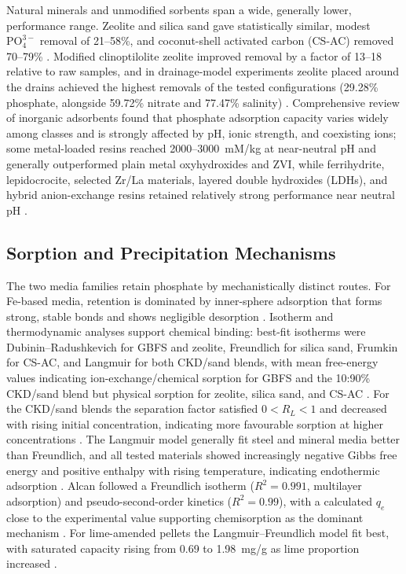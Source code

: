 \documentclass[11pt]{article}
\begin{document}
Natural minerals and unmodified sorbents span a wide, generally lower,
performance range. Zeolite and silica sand gave statistically similar, modest
$\mathrm{PO_4^{3-}}$ removal of 21--58\%, and coconut-shell activated carbon
(CS-AC) removed 70--79\% \parencite{Agrawal2011}. Modified clinoptilolite zeolite
improved removal by a factor of 13--18 relative to raw samples, and in
drainage-model experiments zeolite placed around the drains achieved the highest
removals of the tested configurations (29.28\% phosphate, alongside 59.72\%
nitrate and 77.47\% salinity) \parencite{Sadeghi2021}. Comprehensive review of
inorganic adsorbents found that phosphate adsorption capacity varies widely among
classes and is strongly affected by pH, ionic strength, and coexisting ions; some
metal-loaded resins reached 2000--3000~mM/kg at near-neutral pH and generally
outperformed plain metal oxyhydroxides and ZVI, while ferrihydrite,
lepidocrocite, selected Zr/La materials, layered double hydroxides (LDHs), and
hybrid anion-exchange resins retained relatively strong performance near neutral
pH \parencite{Li2020}.

\subsection{Sorption and Precipitation Mechanisms}

The two media families retain phosphate by mechanistically distinct routes.
For Fe-based media, retention is dominated by inner-sphere adsorption that forms
strong, stable bonds and shows negligible desorption \parencite{Mendes2022}.
Isotherm and thermodynamic analyses support chemical binding: best-fit isotherms
were Dubinin--Radushkevich for GBFS and zeolite, Freundlich for silica sand,
Frumkin for CS-AC, and Langmuir for both CKD/sand blends, with mean free-energy
values indicating ion-exchange/chemical sorption for GBFS and the 10:90\% CKD/sand
blend but physical sorption for zeolite, silica sand, and CS-AC
\parencite{Agrawal2011}. For the CKD/sand blends the separation factor satisfied
$0 < R_L < 1$ and decreased with rising initial concentration, indicating more
favourable sorption at higher concentrations \parencite{Agrawal2011}. The Langmuir
model generally fit steel and mineral media better than Freundlich, and all
tested materials showed increasingly negative Gibbs free energy and positive
enthalpy with rising temperature, indicating endothermic adsorption
\parencite{Sellner2019b}. Alcan followed a Freundlich isotherm ($R^2=0.991$,
multilayer adsorption) and pseudo-second-order kinetics ($R^2=0.99$), with a
calculated $q_e$ close to the experimental value supporting chemisorption as the
dominant mechanism \parencite{Kumari2025}. For lime-amended pellets the
Langmuir--Freundlich model fit best, with saturated capacity rising from 0.69 to
1.98~mg/g as lime proportion increased \parencite{Li2017}.
\end{document}
